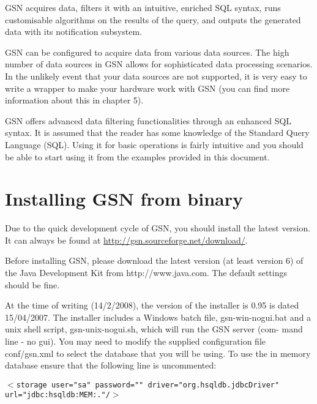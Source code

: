 GSN acquires data, filters it with an intuitive, enriched SQL syntax,
runs customisable algorithms on the results of the query, and outputs
the generated data with its notification subsystem.

GSN can be configured to acquire data from various data sources. The
high number of data sources in GSN allows for sophisticated data
processing scenarios. In the unlikely event that your data sources are
not supported, it is very easy to write a wrapper to make your hardware
work with GSN (you can find more information about this in chapter 5).

GSN offers advanced data filtering functionalities through an enhanced
SQL syntax. It is assumed that the reader has some knowledge of the
Standard Query Language (SQL). Using it for basic operations is fairly
intuitive and you should be able to start using it from the examples
provided in this document.

\section{Installing GSN from binary}

Due to the quick development cycle of GSN, you should install the
latest version.  It can always be found at
\url{http://gsn.sourceforge.net/download/}.

Before installing GSN, please download the latest version (at least
version 6) of the Java Development Kit from http://www.java.com. The
default settings should be fine.

At the time of writing (14/2/2008), the version of the installer is
0.95 is dated 15/04/2007. The installer includes a Windows batch file,
gsn-win-nogui.bat and a unix shell script, gsn-unix-nogui.sh, which
will run the GSN server (com- mand line - no gui). You may need to
modify the supplied configuration file conf/gsn.xml to select the
database that you will be using. To use the in memory database ensure
that the following line is uncommented:

\begin{bashcode}[caption={Database configuration in GSN.}, label=listing:bash:dbconfig]
\texttt{\begin{math}<\end{math}storage user="sa" password="" driver="org.hsqldb.jdbcDriver" url="jdbc:hsqldb:MEM:."/\begin{math}>\end{math}}
\end{bashcode}

